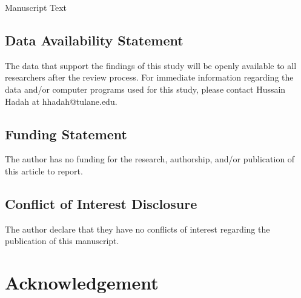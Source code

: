 \documentclass[12pt,english]{article}
\begin{document}
\setcounter{page}{1}
\renewcommand*{\thefootnote}{\arabic{footnote}}
\doublespacing
\begingroup
  \centering
  \Large Manuscript Text\\[1em]
\endgroup


\newpage
\begingroup
{}
\setlength\bibitemsep{5.0pt}
\printbibliography[title=References for Manuscript]
\endgroup
\pagebreak


\subsection*{Data Availability Statement}
The data that support the findings of this study will be openly available to all researchers after the review process. For immediate information regarding the data and/or computer programs used for this study, please contact Hussain Hadah at hhadah@tulane.edu.

\subsection*{Funding Statement}

The author has no funding for the research, authorship, and/or publication of this article to report.

\subsection*{Conflict of Interest Disclosure}
The author declare that they have no conflicts of interest regarding the publication of this manuscript.

\doublespacing
\section*{Acknowledgement}
\ACKNOWLEDGMENTS
\clearpage 

\clearpage 


\end{document}
